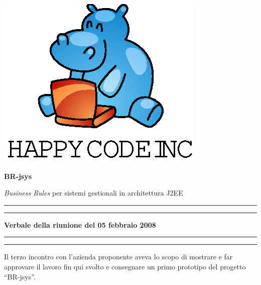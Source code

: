 \documentclass[11pt,titlepage,a4paper]{report}
\begin{document}
\begin{titlepage}
\begin{center}
\vspace*{0.5in}
\includegraphics{logo.eps}
\vspace*{0.2in}

{\Large \textbf{BR-jsys}}

{\Large \emph{Business Rules} per sistemi gestionali in architettura J2EE } 
\vspace{1.3in}
\par\rule{10cm}{.4pt} \par
\par\rule{12cm}{1pt} \par
\vspace*{0.5in}
\LARGE \textbf {Verbale della riunione del 05 febbraio 2008}
\vspace*{0.5in}
\par\rule{12cm}{1pt} \par
\par\rule{10cm}{.4pt} \par

\end{center}
\end{titlepage}
\vspace*{0.5in}
Il terzo incontro con l'azienda proponente aveva lo scopo di mostrare e far approvare il lavoro fin qui svolto e consegnare un primo prototipo del progetto ``BR-jsys''.
\thispagestyle{plain}
\end{document}
